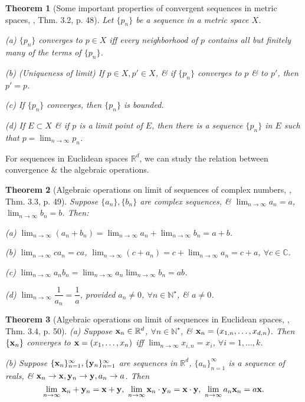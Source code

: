 \documentclass[oneside]{book}
\newtheorem{theorem}{Theorem}
\begin{document}
\begin{theorem}[Some important properties of convergent sequences in metric spaces, \cite{Rudin1976}, Thm. 3.2, p. 48]
	Let $\{p_n\}$ be a sequence in a metric space $X$.
	\item(a) $\{p_n\}$ converges to $p\in X$ iff every neighborhood of $p$ contains all but finitely many of the terms of $\{p_n\}$.
	\item(b) {\rm(Uniqueness of limit)} If $p\in X,p'\in X$, \& if $\{p_n\}$ converges to $p$ \& to $p'$, then $p' = p$.
	\item(c) If $\{p_n\}$ converges, then $\{p_n\}$ is bounded.
	\item(d) If $E\subset X$ \& if $p$ is a limit point of $E$, then there is a sequence $\{p_n\}$ in $E$ such that $p = \lim_{n\to\infty} p_n$.
\end{theorem}
For sequences in Euclidean spaces $\mathbb{R}^d$, we can study the relation between convergence \& the algebraic operations.

\begin{theorem}[Algebraic operations on limit of sequences of complex numbers, \cite{Rudin1976}, Thm. 3.3, p. 49]
	Suppose $\{a_n\},\{b_n\}$ are complex sequences, \& $\lim_{n\to\infty} a_n = a$,$\lim_{n\to\infty} b_n = b$. Then:
	\item(a) $\lim_{n\to\infty} (a_n + b_n) = \lim_{n\to\infty} a_n + \lim_{n\to\infty} b_n = a + b$.
	\item(b) $\lim_{n\to\infty} ca_n = ca$, $\lim_{n\to\infty} (c + a_n) = c + \lim_{n\to\infty} a_n = c + a$, $\forall c\in\mathbb{C}$.
	\item(c) $\lim_{n\to\infty} a_nb_n = \lim_{n\to\infty} a_n\lim_{n\to\infty} b_n = ab$.
	\item(d) $\lim_{n\to\infty} \dfrac{1}{a_n} = \dfrac{1}{a}$, provided $a_n\ne0$, $\forall n\in\mathbb{N}^\star$, \& $a\ne0$.
\end{theorem}

\begin{theorem}[Algebraic operations on limit of sequences in Euclidean spaces, \cite{Rudin1976}, Thm. 3.4, p. 50]
	\item(a) Suppose ${\bf x}_n\in\mathbb{R}^d$, $\forall n\in\mathbb{N}^\star$, \& ${\bf x}_n = (x_{1,n},\ldots,x_{d,n})$. Then $\{{\bf x}_n\}$ converges to ${\bf x} = (x_1,\ldots,x_n)$ iff $\lim_{n\to\infty} x_{i,n} = x_i$, $\forall i = 1,\ldots,k$.
	\item(b) Suppose $\{{\bf x}_n\}_{n=1}^\infty,\{{\bf y}_n\}_{n=1}^\infty$ are sequences in $\mathbb{R}^d$, $\{a_n\}_{n=1}^\infty$ is a sequence of reals, \& ${\bf x}_n\to{\bf x},{\bf y}_n\to{\bf y},a_n\to a$. Then
	\begin{equation*}
		\lim_{n\to\infty} {\bf x}_n + {\bf y}_n = {\bf x} + {\bf y},\ \lim_{n\to\infty} {\bf x}_n\cdot{\bf y}_n = {\bf x}\cdot{\bf y},\ \lim_{n\to\infty} a_n{\bf x}_n = a{\bf x}.
	\end{equation*}
\end{theorem}
\end{document}
